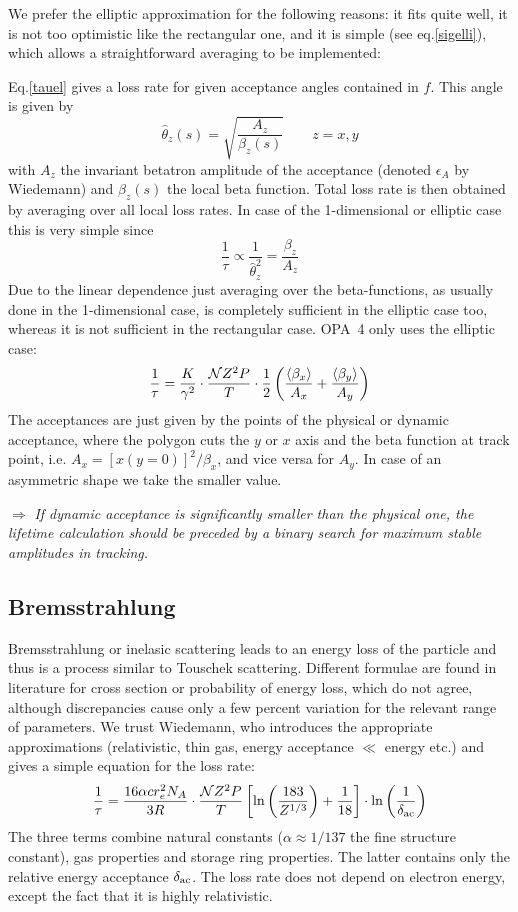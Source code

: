 \documentclass[12pt]{article}
\newcommand\beq{\begin{equation}}
\newcommand\eeq{\end{equation}}
\newcommand\todo[1]{$\Longrightarrow$ {\em #1} }
\begin{document}
We prefer the elliptic approximation for the following reasons: it fits quite well, it is not too optimistic like the rectangular one, and it is simple (see eq.\ref{sigelli}), which allows a straightforward averaging to be implemented:

Eq.\ref{tauel} gives a loss rate for given acceptance angles contained in $f$. This angle is given by
\beq
\hat\theta_z (s) = \sqrt{\frac{A_z}{\beta_z (s)}}\qquad z=x,y
\eeq
with $A_z$ the invariant betatron amplitude of the acceptance (denoted $\epsilon_A$ by Wiedemann) and $\beta_z (s)$ the local beta function.
Total loss rate is then obtained by averaging over all local loss rates. In case of the 1-dimensional or elliptic case this is very simple since
\[
\frac{1}{\tau} \propto \frac{1}{\hat\theta_z^2} = \frac{\beta_z}{A_z}
\]
Due to the linear dependence just averaging over the beta-functions, as usually done in the 1-dimensional case, is completely sufficient in the elliptic case too, whereas it is not sufficient in the rectangular case. OPA~4 only uses the elliptic case:
\beq\label{tauelopa}
\frac{1}{\tau} = \frac{K}{\gamma^2} \cdot \frac{ {\cal N} Z^2 P}{T} \cdot \frac{1}{2} \left( \frac{\langle\beta_x\rangle}{A_x} +  \frac{\langle\beta_y\rangle}{A_y}\right)
\eeq
The acceptances are just given by the points of the physical or dynamic acceptance, where the polygon cuts the $y$ or $x$ axis and the beta function at track point, i.e. $A_x  = [x(y=0)]^2/\beta_x$, and vice versa for $A_y$. In case of an asymmetric shape we take the smaller value.

\todo{If dynamic acceptance is significantly smaller than the physical one, the lifetime calculation should be preceded by a binary search for maximum stable amplitudes in tracking.}

\subsection{Bremsstrahlung}
Bremsstrahlung or inelasic scattering leads to an energy loss of the particle and thus is a process similar to Touschek scattering. Different formulae are found in literature for cross section or probability of energy loss, which do not agree, although discrepancies cause only a few percent variation for the relevant range of parameters.
We trust Wiedemann, who introduces the appropriate approximations (relativistic, thin gas, energy acceptance $\ll$ energy etc.) and gives a simple equation for the loss rate:
\beq\label{taubrems}
\frac{1}{\tau} = \frac{16 \alpha c r_e^2 N_A}{3 R}\cdot \frac{{\cal N}Z^2 P}{T}\left[ \ln\left(\frac{183}{Z^{1/3}}\right)+\frac{1}{18}\right]\cdot \ln\left(\frac{1}{\delta_{\rm ac}}\right)
\eeq
The three terms combine natural constants ($\alpha\approx 1/137$ the fine structure constant), gas properties and storage ring properties. The latter contains only the relative energy acceptance $\delta_{\rm ac}$. The loss rate does not depend on electron energy, except the fact that it is highly relativistic.
\end{document}
